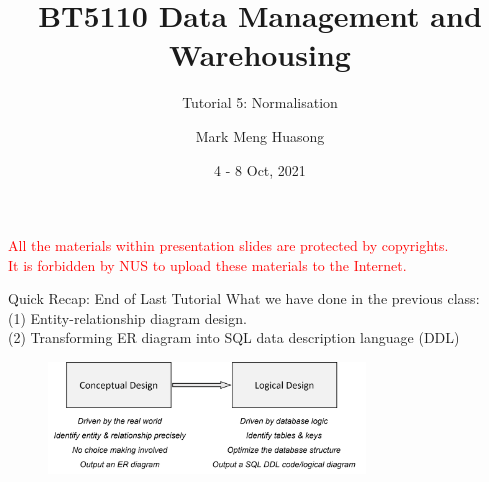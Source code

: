 \title{BT5110 Data Management and Warehousing}

\subtitle{Tutorial 5: Normalisation}

\author{Mark Meng Huasong}



\date{4 - 8 Oct, 2021}

\begin{frame}
	\titlepage
	\begin{tcolorbox}
		\begin{center}
			{\scriptsize \textcolor{red}{All the materials within presentation slides are protected by copyrights.\\
					It is forbidden by NUS to upload these materials to the Internet.}}
		\end{center}
	\end{tcolorbox}
\end{frame}

\begin{frame}[fragile]{Quick Recap: End of Last Tutorial}
	What we have done in the previous class:\\\vspace{5pt}
	(1) Entity-relationship diagram design. \\
	(2) Transforming ER diagram into SQL data description language (DDL)\\\vspace{5pt}
	\begin{figure}
		\includegraphics[width=0.75\textwidth, trim=0 0 0 0, clip]{t5/images/steps.png}
	\end{figure}
\end{frame}


